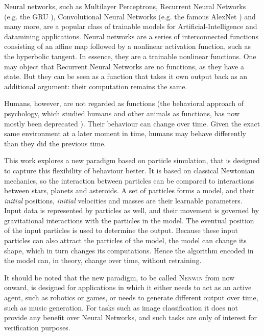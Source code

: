 Neural networks, such as Multilayer Perceptrons, Recurrent Neural Networks (e.g. the GRU \cite{gru_original}), Convolutional Neural Networks (e.g. the famous AlexNet \cite{alexnet}) and many more, are a popular class of trainable models for Artificial-Intelligence and datamining applications. Neural networks are a series of interconnected functions consisting of an affine map followed by a nonlinear activation function, such as the hyperbolic tangent. In essence, they are a trainable nonlinear functions. One may object that Recurrent Neural Networks are no functions, as they have a state. But they can be seen as a function that takes it own output back as an additional argument: their computation remains the same.

Humans, however, are not regarded as functions (the behavioral approach of psychology, which studied humans and other animals as functions, has now mostly been deprecated \cite{matlin2016cognition}). Their behaviour can change over time. Given the exact same environment at a later moment in time, humans may behave differently than they did the previous time.

This work explores a new paradigm based on particle simulation, that is designed to capture this flexibility of behaviour better. It is based on classical Newtonian mechanics, so the interaction between particles can be compared to interactions between stars, planets and asteroids. A set of particles forms a model, and their \textit{initial} positions, \textit{initial} velocities and masses are their learnable parameters. Input data is represented by particles as well, and their movement is governed by gravitational interactions with the particles in the model. The eventual position of the input particles is used to determine the output. Because these input particles can also attract the particles of the model, the model can change its shape, which in turn changes its computations. Hence the algorithm encoded in the model can, in theory, change over time, without retraining. 

It should be noted that the new paradigm, to be called \textsc{Nenwin} from now onward, is designed for applications in which it either needs to act as an active agent, such as robotics or games, or needs to generate different output over time, such as music generation. For tasks such as image classification it does not provide any benefit over Neural Networks, and such tasks are only of interest for verification purposes.